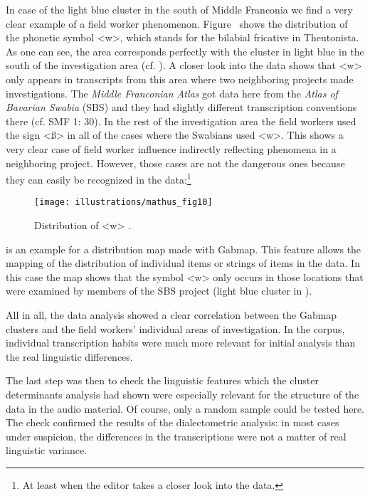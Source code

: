 \documentclass[output=paper]{LSP/langsci}
\begin{document}
In case of the light blue cluster in the south of Middle Franconia we find a very clear example of a field worker phenomenon. Figure~ shows the distribution of the phonetic symbol {\textless}w{\textgreater}, which stands for the bilabial fricative in Theutonista. As one can see, the area corresponds perfectly with the cluster in light blue in the south of the investigation area (cf. ). A closer look into the data shows that {\textless}w{\textgreater} only appears in transcripts from this area where two neighboring projects made investigations. The \textit{Middle Franconian Atlas} got data here from the \textit{Atlas of Bavarian Swabia} (SBS) and they had slightly different transcription conventions there (cf. SMF 1: 30). In the rest of the investigation area the field workers used the sign {\textless}ß{\textgreater} in all of the cases where the Swabians used {\textless}w{\textgreater}. This shows a very clear case of field worker influence indirectly reflecting phenomena in a neighboring project. However, those cases are not the dangerous ones because they can easily be recognized in the data:\footnote{At least when the editor takes a closer look into the data.}

\begin{figure}[t]
\texttt{[image: illustrations/mathus\_fig10]}
\caption{Distribution of {\textless}w{\textgreater} \citep[226]{mathussek_sprachraume_2014}.}
\label{fig:mathus:10}
\end{figure}
  
 is an example for a distribution map made with Gabmap. This feature allows the mapping of the distribution of individual items or strings of items in the data. In this case the map shows that the symbol {\textless}w{\textgreater} only occurs in those locations that were examined by members of the SBS project (light blue cluster in ).

All in all, the data analysis showed a clear correlation between the Gabmap clusters and the field workers' individual areas of investigation. In the corpus, individual transcription habits were much more relevant for initial analysis than the real linguistic differences.

The last step was then to check the linguistic features which the cluster determinants analysis had shown were especially relevant for the structure of the data in the audio material. Of course, only a random sample could be tested here. The check confirmed the results of the dialectometric analysis: in most cases under suspicion, the differences in the transcriptions were not a matter of real linguistic variance.
\end{document}
